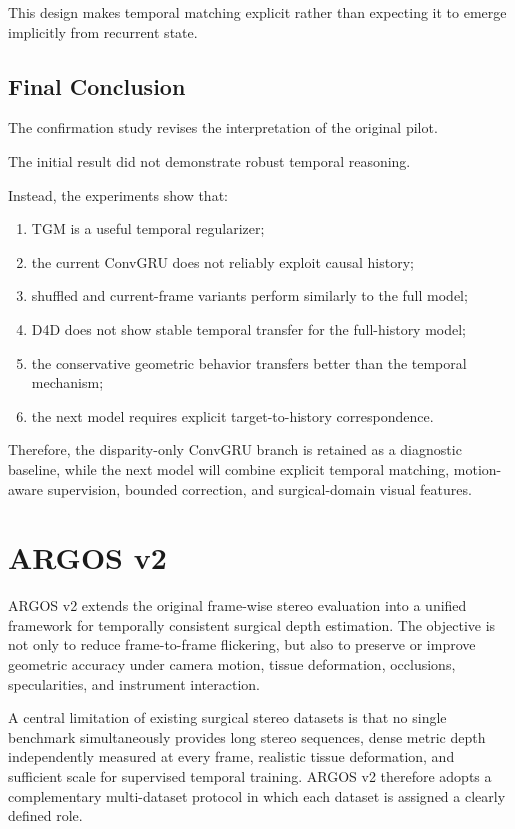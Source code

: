 \documentclass[11pt,a4paper]{article}
\begin{document}
This design makes temporal matching explicit rather than expecting it to emerge
implicitly from recurrent state.

\subsection{Final Conclusion}

The confirmation study revises the interpretation of the original pilot.

The initial result did not demonstrate robust temporal reasoning.

Instead, the experiments show that:

\begin{enumerate}[leftmargin=*]
    \item TGM is a useful temporal regularizer;
    \item the current ConvGRU does not reliably exploit causal history;
    \item shuffled and current-frame variants perform similarly to the full model;
    \item D4D does not show stable temporal transfer for the full-history model;
    \item the conservative geometric behavior transfers better than the temporal
    mechanism;
    \item the next model requires explicit target-to-history correspondence.
\end{enumerate}

Therefore, the disparity-only ConvGRU branch is retained as a diagnostic baseline,
while the next model will combine explicit temporal matching, motion-aware
supervision, bounded correction, and surgical-domain visual features.

\section{ARGOS v2}
\label{sec:argos_v2}

ARGOS v2 extends the original frame-wise stereo evaluation into a unified framework for
temporally consistent surgical depth estimation. The objective is not only to reduce
frame-to-frame flickering, but also to preserve or improve geometric accuracy under camera
motion, tissue deformation, occlusions, specularities, and instrument interaction.

A central limitation of existing surgical stereo datasets is that no single benchmark
simultaneously provides long stereo sequences, dense metric depth independently measured at
every frame, realistic tissue deformation, and sufficient scale for supervised temporal
training. ARGOS v2 therefore adopts a complementary multi-dataset protocol in which each
dataset is assigned a clearly defined role.
\end{document}

